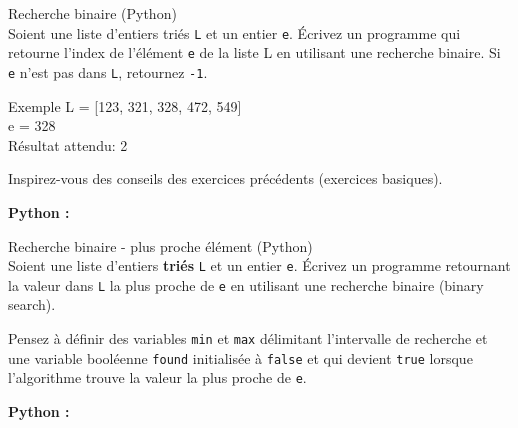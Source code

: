 \begin{Exercice}[10 minutes] Recherche binaire (Python)\\

    Soient une liste d’entiers triés \lstinline{L} et un entier \lstinline{e}. Écrivez un programme qui retourne l'index de l'élément \lstinline{e} de la liste L en utilisant une recherche binaire. Si \lstinline{e} n’est pas dans \lstinline{L}, retournez \lstinline{-1}.\\
    
    \begin{Example}{\faTerminal \quad Exemple}
        L = [123, 321, 328, 472, 549] \\
        e = 328\\
    
    Résultat attendu: 2
    \end{Example}
    
    
    
    \begin{conseil}
        Inspirez-vous des conseils des exercices précédents (exercices basiques).
    \end{conseil}
    
        \begin{solution}
            \textbf{Python :}
            
        \end{solution}
    
    \end{Exercice}
    

\begin{Exercice}[15 minutes] Recherche binaire - plus proche élément (Python)\\

Soient une liste d’entiers \textbf{triés} \lstinline{L} et un entier \lstinline{e}. Écrivez un programme retournant la valeur dans \lstinline{L} la plus proche de \lstinline{e} en utilisant une recherche binaire (binary search).\\



\begin{conseil}
    Pensez à définir des variables \lstinline{min} et \lstinline{max} délimitant l'intervalle de recherche et une variable booléenne \lstinline{found} initialisée à \lstinline{false} et qui devient \lstinline{true} lorsque l'algorithme trouve la valeur la plus proche de \lstinline{e}. 
    
\end{conseil}

    \begin{solution}
        \textbf{Python :}
        
    \end{solution}

\end{Exercice}



